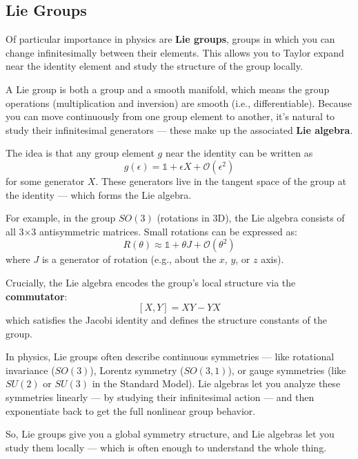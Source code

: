 \subsection{Lie Groups}

Of particular importance in physics are \textbf{Lie groups}, groups in which you can change infinitesimally between their elements. This allows you to Taylor expand near the identity element and study the structure of the group locally.

A Lie group is both a group and a smooth manifold, which means the group operations (multiplication and inversion) are smooth (i.e., differentiable). Because you can move continuously from one group element to another, it's natural to study their infinitesimal generators — these make up the associated \textbf{Lie algebra}.

The idea is that any group element $g$ near the identity can be written as
\[
g(\epsilon) = \mathbb{1} + \epsilon X + \mathcal{O}(\epsilon^2)
\]
for some generator $X$. These generators live in the tangent space of the group at the identity — which forms the Lie algebra.

For example, in the group $SO(3)$ (rotations in 3D), the Lie algebra consists of all 3×3 antisymmetric matrices. Small rotations can be expressed as:
\[
R(\theta) \approx \mathbb{1} + \theta J + \mathcal{O}(\theta^2)
\]
where $J$ is a generator of rotation (e.g., about the $x$, $y$, or $z$ axis).

Crucially, the Lie algebra encodes the group's local structure via the \textbf{commutator}:
\[
[X, Y] = XY - YX
\]
which satisfies the Jacobi identity and defines the structure constants of the group.

In physics, Lie groups often describe continuous symmetries — like rotational invariance ($SO(3)$), Lorentz symmetry ($SO(3,1)$), or gauge symmetries (like $SU(2)$ or $SU(3)$ in the Standard Model). Lie algebras let you analyze these symmetries linearly — by studying their infinitesimal action — and then exponentiate back to get the full nonlinear group behavior.

So, Lie groups give you a global symmetry structure, and Lie algebras let you study them locally — which is often enough to understand the whole thing.
